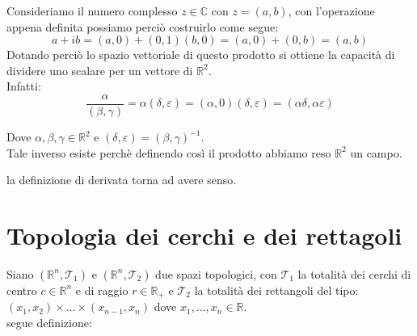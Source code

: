\documentclass{article}
\begin{document}
    Consideriamo il numero complesso $z \in \mathbb{C}$ con $z = (a,b)$, con l'operazione appena definita possiamo perciò costruirlo come segue:
    \begin{equation*}
        a + ib = (a,0) + (0,1)(b,0) = (a, 0) + (0,b) = (a,b) 
    \end{equation*}
        Dotando perciò lo spazio vettoriale di questo prodotto si ottiene la capacità di dividere uno scalare per un vettore di $\mathbb{R}^2$. \\
        Infatti: 
        \begin{equation*}
            \frac{\alpha }{(\beta ,\gamma)} = \alpha (\delta ,\varepsilon) = (\alpha, 0)(\delta ,\varepsilon) = (\alpha \delta, \alpha \varepsilon )
        \end{equation*}

        Dove $\alpha,\beta,\gamma \in \mathbb{R}^2$ e $(\delta ,\varepsilon) = (\beta, \gamma)^{-1}$. \\
        Tale inverso esiste perchè definendo così il prodotto abbiamo reso $\mathbb{R}^2$ un campo.

        la definizione di derivata torna ad avere senso.

    \section*{Topologia dei cerchi e dei rettagoli}
        Siano $(\mathbb{R}^n, \mathcal{T}_1)$ e $(\mathbb{R}^n, \mathcal{T}_2)$ due spazi topologici, con $\mathcal{T}_1$ la totalità dei cerchi di centro $c \in \mathbb{R}^n$ e di raggio $r \in \mathbb{R}_+$
        e $\mathcal{T}_2$ la totalità dei rettangoli del tipo: \\ $(x_1,x_2)\times \dots \times (x_{n-1},x_n)$ dove $x_1,\dots ,x_n \in \mathbb{R}$. \\ 
        segue definizione: 
\end{document}
